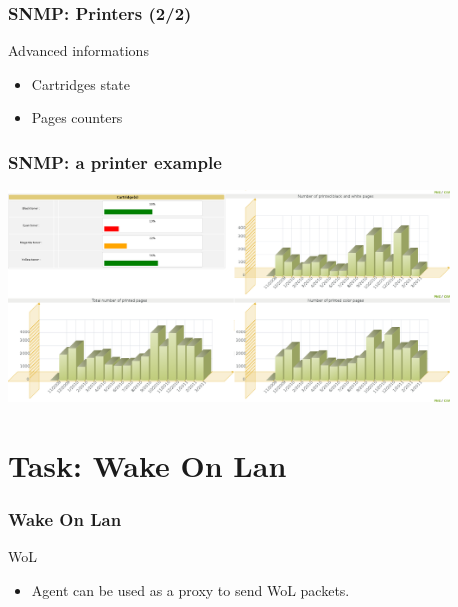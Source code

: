 \documentclass{beamer}
\begin{document}
\begin{frame}
    \frametitle{SNMP: Printers (2/2)}

    \begin{block}{Advanced informations}
    \begin{itemize}
    \item Cartridges state
    \item Pages counters
    \end{itemize}
    \end{block}
\end{frame}

\begin{frame}
    \frametitle{SNMP: a printer example}

    \begin{center}
    \includegraphics[width=11.7cm]{./pics/printer_graph.png}
    \end{center}
\end{frame}

\section{Task: Wake On Lan}

\begin{frame}
    \frametitle{Wake On Lan}

    \begin{block}{WoL}
    \begin{itemize}
        \item Agent can be used as a proxy to send WoL packets.
    \end{itemize}
    \end{block}

\end{frame}
\end{document}
